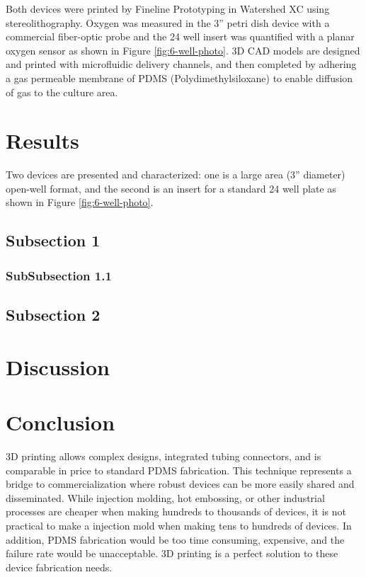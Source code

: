 Both devices were printed by Fineline Prototyping in Watershed XC using stereolithography.
Oxygen was measured in the 3” petri dish device with a commercial fiber-optic probe and the 24 well insert was quantified with a planar oxygen sensor as shown in Figure \ref{fig:6-well-photo}.
3D CAD models are designed and printed with microfluidic delivery channels, and then completed by adhering a gas permeable membrane of PDMS (Polydimethylsiloxane) to enable diffusion of gas to the culture area.

\section*{Results}

Two devices are presented and characterized: one is a large area (3” diameter) open-well format, and the second is an insert for a standard 24 well plate as shown in Figure \ref{fig:6-well-photo}.

\subsection*{Subsection 1}

\subsubsection*{SubSubsection 1.1}

\subsection*{Subsection 2}

\section*{Discussion}

\section*{Conclusion}

3D printing allows complex designs, integrated tubing connectors, and is comparable in price to standard PDMS fabrication.
This technique represents a bridge to commercialization where robust devices can be more easily shared and disseminated.
While injection molding, hot embossing, or other industrial processes are cheaper when making hundreds to thousands of devices, it is not practical to make a injection mold when making tens to hundreds of devices.
In addition, PDMS fabrication would be too time consuming, expensive, and the failure rate would be unacceptable.
3D printing is a perfect solution to these device fabrication needs.


